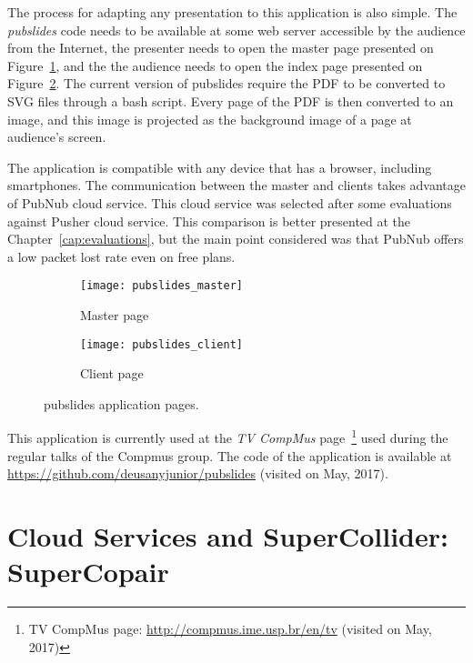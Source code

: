The process for adapting any presentation to this application is also simple.
The \textit{pubslides} code needs to be available at some web server accessible by the audience from the Internet, the presenter needs to open the master page presented on Figure~\ref{fig:pubslidesmaster}, and the the audience needs to open the index page presented on Figure~\ref{fig:pubslidesclient}.
The current version of pubslides require the PDF to be converted to SVG files through a bash script.
Every page of the PDF is then converted to an image, and this image is projected as the background image of a page at audience's screen.

The application is compatible with any device that has a browser, including smartphones.
The communication between the master and clients takes advantage of PubNub cloud service.
This cloud service was selected after some evaluations against Pusher cloud service.
This comparison is better presented at the Chapter~\ref{cap:evaluations}, but the main point considered was that PubNub offers a low packet lost rate even on free plans.

\begin{figure*}[!ht]
\centering
\begin{subfigure}{.45\textwidth}
	\texttt{[image: pubslides\_master]}
    \caption{Master page}
	\label{fig:pubslidesmaster}
\end{subfigure}
\begin{subfigure}{.45\textwidth}
	\texttt{[image: pubslides\_client]}
	\caption{Client page}
	\label{fig:pubslidesclient}
\end{subfigure}

\caption{pubslides application pages.}
\label{fig:pubslidesapplication}
\end{figure*}


This application is currently used at the \textit{TV CompMus} page~\footnote{TV CompMus page: \url{http://compmus.ime.usp.br/en/tv} (visited on May, 2017)} used during the regular talks of the Compmus group.
The code of the application is available at \url{https://github.com/deusanyjunior/pubslides} (visited on May, 2017).

\section{Cloud Services and SuperCollider: SuperCopair}
\label{apesec:appsupercopair}

